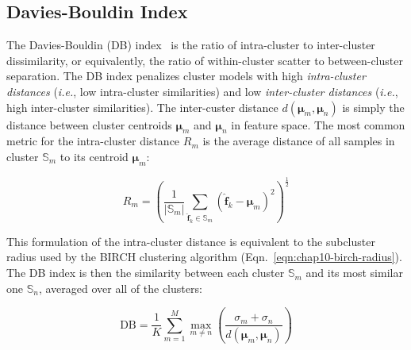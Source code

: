 
\subsection{Davies-Bouldin Index}
\label{subsec:chap10-db-index}

The Davies-Bouldin (DB) index~\cite{davies1979dbindex} is the ratio of intra-cluster to inter-cluster dissimilarity, or equivalently, the ratio of within-cluster scatter to between-cluster separation. The DB index penalizes cluster models with high \textit{intra-cluster distances} (\textit{i.e.}, low intra-cluster similarities) and low \textit{inter-cluster distances} (\textit{i.e.}, high inter-cluster similarities). The inter-custer distance $d\left(\boldsymbol{\mu}_{m},\boldsymbol{\mu}_{n}\right)$ is simply the distance between cluster centroids $\boldsymbol{\mu}_{m}$ and $\boldsymbol{\mu}_{n}$ in feature space. The most common metric for the intra-cluster distance $R_{m}$ is the average distance of all samples in cluster $\mathbb{S}_{m}$ to its centroid $\boldsymbol{\mu}_{m}$:

\begin{equation}
\label{eqn:chap10-db-mean-distance}
R_{m} = \left(\frac{1}{|\mathbb{S}_{m}|}\displaystyle\sum\limits_{\boldsymbol{\hat{f}}_{k} \in \mathbb{S}_{m}} \left(\boldsymbol{\hat{f}}_{k} - \boldsymbol{\mu}_{m}\right)^{2}\right)^{\frac{1}{2}}
\end{equation}

\noindent This formulation of the intra-cluster distance is equivalent to the subcluster radius used by the BIRCH clustering algorithm (Eqn.~\ref{eqn:chap10-birch-radius}). The DB index is then the similarity between each cluster $\mathbb{S}_{m}$ and its most similar one $\mathbb{S}_{n}$, averaged over all of the clusters:

\begin{equation}
\label{eqn:chap10-db-index}
\textrm{DB} = \frac{1}{K} \displaystyle\sum\limits_{m=1}^{M} \max_{m \ne n} \left(\frac{\sigma_{m} + \sigma_{n}}{d\left(\boldsymbol{\mu}_{m},\boldsymbol{\mu}_{n}\right)}\right) 
\end{equation}

